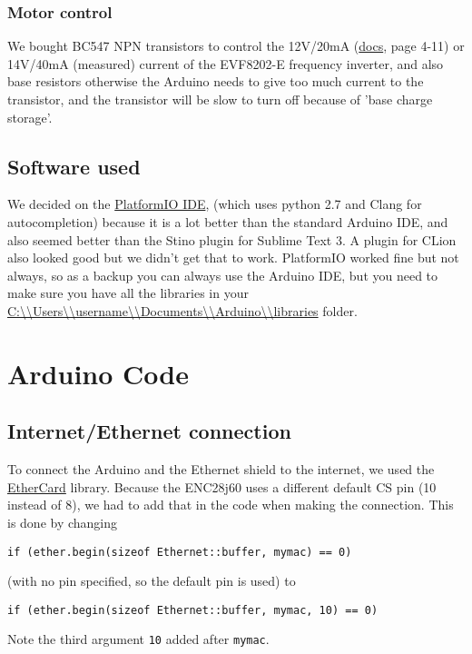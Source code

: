 \documentclass{article}
\begin{document}
		\subsubsection{Motor control}
		We bought BC547 NPN transistors to control the 12V/20mA (\href{http://download.lenze.com/TD/8201-8204__Inverter__v02-08__EN.pdf }{docs}, page 4-11) or 14V/40mA (measured) current of the EVF8202-E frequency inverter, and also base resistors otherwise the Arduino needs to give too much current to the transistor, and the transistor will be slow to turn off because of 'base charge storage'.
	
		\subsection{Software used}
		We decided on the \href{http://platformio.org/platformio-ide}{PlatformIO IDE}, (which uses python 2.7 and Clang for autocompletion) because it is a lot better than the standard Arduino IDE, and also seemed better than the Stino plugin for Sublime Text 3. A plugin for CLion also looked good but we didn't get that to work. PlatformIO worked fine but not always, so as a backup you can always use the Arduino IDE, but you need to make sure you have all the libraries in your \url{C:\\Users\\username\\Documents\\Arduino\\libraries} folder.
	
	\section{Arduino Code}
		\subsection{Internet/Ethernet connection}
			To connect the Arduino and the Ethernet shield to the internet, we used the \href{https://github.com/jcw/ethercard}{EtherCard} library. Because the ENC28j60 uses a different default CS pin (10 instead of 8), we had to add that in the code when making the connection. This is done by changing
			\begin{lstlisting}
if (ether.begin(sizeof Ethernet::buffer, mymac) == 0)
			\end{lstlisting}
			(with no pin specified, so the default pin is used) to
			\begin{lstlisting}
if (ether.begin(sizeof Ethernet::buffer, mymac, 10) == 0)
			\end{lstlisting}
			Note the third argument \lstinline|10| added after \lstinline|mymac|.
			
\end{document}
